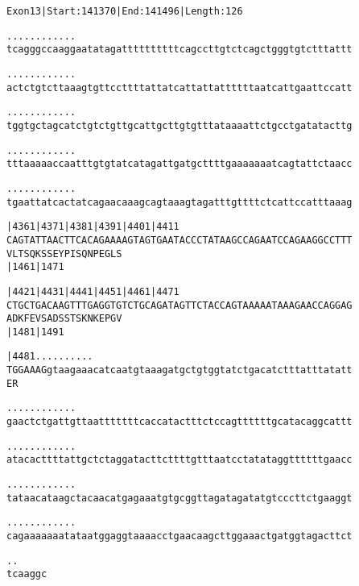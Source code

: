\documentclass{article}
\begin{document}
\newpage
\begin{alltt}
Exon 13 | Start: 141370 | End: 141496 | Length: 126

.    .    .    .    .    .    .    .    .    .    .    .    
tcagggccaaggaatatagattttttttttcagccttgtctcagctgggtgtctttattt

.    .    .    .    .    .    .    .    .    .    .    .    
actctgtcttaaagtgttccttttattatcattattattttttaatcattgaattccatt

.    .    .    .    .    .    .    .    .    .    .    .    
tggtgctagcatctgtctgttgcattgcttgtgtttataaaattctgcctgatatacttg

.    .    .    .    .    .    .    .    .    .    .    .    
tttaaaaaccaatttgtgtatcatagattgatgcttttgaaaaaaatcagtattctaacc

.    .    .    .    .    .    .    .    .    .    .    .    
tgaattatcactatcagaacaaagcagtaaagtagatttgttttctcattccatttaaag

   |4361     |4371     |4381     |4391     |4401     |4411  
CAGTATTAACTTCACAGAAAAGTAGTGAATACCCTATAAGCCAGAATCCAGAAGGCCTTT
  V  L  T  S  Q  K  S  S  E  Y  P  I  S  Q  N  P  E  G  L  S
                       |1461                         |1471  

   |4421     |4431     |4441     |4451     |4461     |4471  
CTGCTGACAAGTTTGAGGTGTCTGCAGATAGTTCTACCAGTAAAAATAAAGAACCAGGAG
  A  D  K  F  E  V  S  A  D  S  S  T  S  K  N  K  E  P  G  V
                       |1481                         |1491  

   |4481   .    .    .    .    .    .    .    .    .    .   
TGGAAAGgtaagaaacatcaatgtaaagatgctgtggtatctgacatctttatttatatt
  E  R                                                      

 .    .    .    .    .    .    .    .    .    .    .    .   
gaactctgattgttaatttttttcaccatactttctccagttttttgcatacaggcattt

 .    .    .    .    .    .    .    .    .    .    .    .   
atacacttttattgctctaggatacttcttttgtttaatcctatataggttttttgaacc

 .    .    .    .    .    .    .    .    .    .    .    .   
tataacataagctacaacatgagaaatgtgcggttagatagatatgtcccttctgaaggt

 .    .    .    .    .    .    .    .    .    .    .    .   
cagaaaaaaatataatggaggtaaaacctgaacaagcttggaaactgatggtagacttct

 .    .
tcaaggc
\end{alltt}
\newpage
\end{document}
